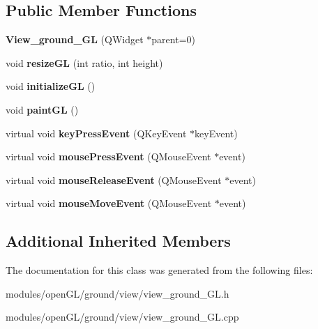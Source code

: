 \subsection*{Public Member Functions}
\begin{DoxyCompactItemize}
\item 
\hypertarget{classView__ground__GL_ad280fec3ac587e32b1aeb42275f4bee1}{{\bfseries View\-\_\-ground\-\_\-\-G\-L} (Q\-Widget $\ast$parent=0)}\label{classView__ground__GL_ad280fec3ac587e32b1aeb42275f4bee1}

\item 
\hypertarget{classView__ground__GL_ae7eb5bc5e8d619708c4cec03e8f7c6d8}{void {\bfseries resize\-G\-L} (int ratio, int height)}\label{classView__ground__GL_ae7eb5bc5e8d619708c4cec03e8f7c6d8}

\item 
\hypertarget{classView__ground__GL_a99b642d0e4edb0c28da8388ea6e5f554}{void {\bfseries initialize\-G\-L} ()}\label{classView__ground__GL_a99b642d0e4edb0c28da8388ea6e5f554}

\item 
\hypertarget{classView__ground__GL_a2f99317cb82dad07eeeef70fe5f922af}{void {\bfseries paint\-G\-L} ()}\label{classView__ground__GL_a2f99317cb82dad07eeeef70fe5f922af}

\item 
\hypertarget{classView__ground__GL_a0345ad5bad48bfd071bc3e75bc462418}{virtual void {\bfseries key\-Press\-Event} (Q\-Key\-Event $\ast$key\-Event)}\label{classView__ground__GL_a0345ad5bad48bfd071bc3e75bc462418}

\item 
\hypertarget{classView__ground__GL_af78b4d515163a34b140d08a8bc100c5b}{virtual void {\bfseries mouse\-Press\-Event} (Q\-Mouse\-Event $\ast$event)}\label{classView__ground__GL_af78b4d515163a34b140d08a8bc100c5b}

\item 
\hypertarget{classView__ground__GL_ac790d474860b0bde374f08cdfb2471f2}{virtual void {\bfseries mouse\-Release\-Event} (Q\-Mouse\-Event $\ast$event)}\label{classView__ground__GL_ac790d474860b0bde374f08cdfb2471f2}

\item 
\hypertarget{classView__ground__GL_a1c78b975b798824d45c7204b25fc24c4}{virtual void {\bfseries mouse\-Move\-Event} (Q\-Mouse\-Event $\ast$event)}\label{classView__ground__GL_a1c78b975b798824d45c7204b25fc24c4}

\end{DoxyCompactItemize}
\subsection*{Additional Inherited Members}


The documentation for this class was generated from the following files\-:\begin{DoxyCompactItemize}
\item 
modules/open\-G\-L/ground/view/view\-\_\-ground\-\_\-\-G\-L.\-h\item 
modules/open\-G\-L/ground/view/view\-\_\-ground\-\_\-\-G\-L.\-cpp\end{DoxyCompactItemize}
